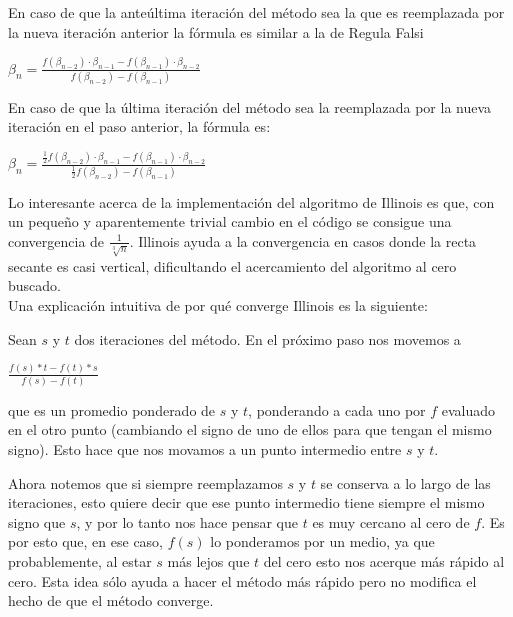 En caso de que la ante\'ultima iteraci\'on del m\'etodo sea la que es 
reemplazada por la nueva iteraci\'on anterior la f\'ormula 
es similar a la de Regula Falsi

\begin{center}
$\beta_n = \frac{f(\beta_{n-2})\cdot \beta_{n-1} - f(\beta_{n-1})\cdot\beta_{n-2}}
{f(\beta_{n-2})-f(\beta_{n-1})}$\\
\end{center}

En caso de que la \'ultima iteraci\'on del m\'etodo sea la reemplazada 
por la nueva iteraci\'on en el paso anterior, la f\'ormula es:
\begin{center}
$\beta_n = \frac{\frac{1}{2}f(\beta_{n-2})\cdot \beta_{n-1} - 
f(\beta_{n-1})\cdot\beta_{n-2}}
{\frac{1}{2}f(\beta_{n-2})-f(\beta_{n-1})}$ \\
\end{center}

Lo interesante acerca de la implementaci\'on del algoritmo de Illinois es
que, con un peque\~no y aparentemente trivial cambio en el c\'odigo se consigue una
convergencia de $\frac{1}{\sqrt[3]{n}}$. Illinois ayuda a la convergencia en casos
donde la recta secante es casi vertical, dificultando el acercamiento del
algoritmo al cero buscado.\\

Una explicaci\'on intuitiva de por qu\'e converge Illinois es la siguiente: 

Sean $s$ y $t$ dos iteraciones del m\'etodo. En el pr\'oximo paso nos movemos a 

\begin{center}
$\frac{f(s)*t-f(t)*s}{f(s)-f(t)}$\\
\end{center}

que es un promedio ponderado de $s$ y $t$, ponderando a cada uno por $f$ 
evaluado en el otro punto (cambiando el signo de uno de ellos para que 
tengan el mismo signo). Esto hace que nos movamos a un punto intermedio 
entre $s$ y $t$.

Ahora notemos que si siempre reemplazamos $s$ y $t$ se conserva a lo largo 
de las iteraciones, esto quiere decir que ese punto intermedio tiene siempre el 
mismo signo que $s$, y por lo tanto nos hace pensar que $t$ es muy cercano al 
cero de $f$. Es por esto que, en ese caso, $f(s)$ lo ponderamos por un medio, 
ya que probablemente, al estar $s$ m\'as lejos que $t$ del cero esto nos 
acerque m\'as r\'apido al cero. Esta idea s\'olo ayuda a hacer el 
m\'etodo m\'as r\'apido pero no modifica el hecho de que el m\'etodo converge.

